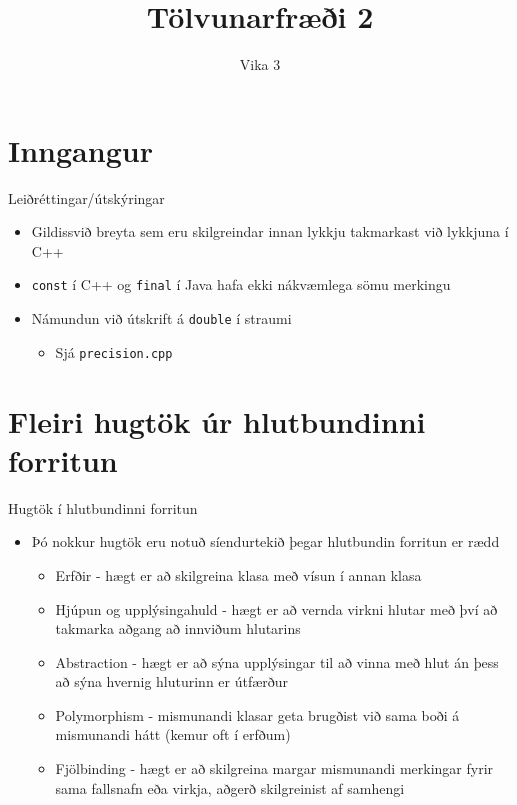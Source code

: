 \documentclass{beamer}
\title{Tölvunarfræði 2}
\subtitle{Vika 3}
\begin{document}
\begin{frame}
	\titlepage
\end{frame}

\section{Inngangur}

\begin{frame}{Leiðréttingar/útskýringar}
	\begin{itemize}
		\item Gildissvið breyta sem eru skilgreindar innan lykkju takmarkast við lykkjuna í C++
		\item \texttt{const} í C++ og \texttt{final} í Java hafa ekki nákvæmlega sömu merkingu
		\item Námundun við útskrift á \texttt{double} í straumi
		      \begin{itemize}
			      \item Sjá \texttt{precision.cpp}
		      \end{itemize}
	\end{itemize}
\end{frame}

\section{Fleiri hugtök úr hlutbundinni forritun}

\begin{frame}{Hugtök í hlutbundinni forritun}
	\begin{itemize}
		\item Þó nokkur hugtök eru notuð síendurtekið þegar hlutbundin forritun er rædd
		      \begin{itemize}
			      \item Erfðir  - hægt er að skilgreina klasa með vísun í annan klasa
			      \item Hjúpun  og upplýsingahuld  - hægt er að vernda virkni hlutar með því að takmarka aðgang að innviðum hlutarins
			      \item Abstraction - hægt er að sýna upplýsingar til að vinna með hlut án þess að sýna hvernig hluturinn er útfærður
			      \item Polymorphism - mismunandi klasar geta brugðist við sama boði á mismunandi hátt (kemur oft í erfðum)
			      \item Fjölbinding  - hægt er að skilgreina margar mismunandi merkingar fyrir sama fallsnafn eða virkja, aðgerð skilgreinist af samhengi
		      \end{itemize}
	\end{itemize}
\end{frame}
\end{document}
